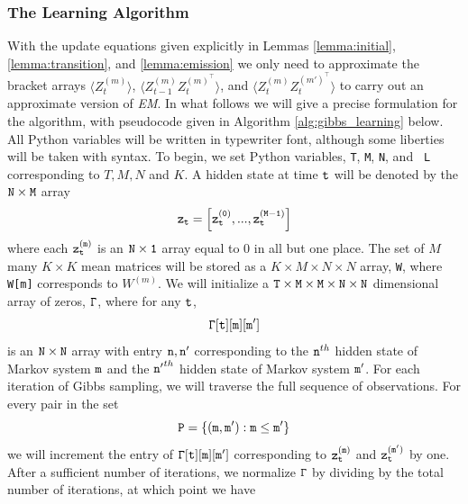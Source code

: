 \documentclass{amsart}
\begin{document}

\subsubsection{The Learning Algorithm}
With the update equations given explicitly in Lemmas 
\ref{lemma:initial}, \ref{lemma:transition}, and \ref{lemma:emission} we 
only need to approximate the bracket arrays 
$\langle Z_{t}^{(m)}\rangle$,
$\langle Z_{t-1}^{(m)}Z_{t}^{(m)^\intercal}\rangle$, and $\langle 
Z_{t}^{(m)}Z_{t}^{(m')^\intercal}\rangle$ to carry out an approximate 
version of {\em EM}. In what follows we will give a precise formulation 
for the algorithm, with pseudocode given in Algorithm 
\ref{alg:gibbs_learning} below.  All Python variables will be written 
in typewriter font, although some liberties will be taken with syntax. 
To begin, we set Python variables, {\tt T}, {\tt M}, {\tt N}, and {\tt 
L} corresponding to $T, M, N$ and $K$.  A hidden state at time ${\tt t}$ will be 
denoted by the ${\tt N\times M}$ array
\[
{\tt z_t} = \left[{\tt z_t^{(0)},...,z_t^{(M-1)}}\right]
\]
where each ${\tt z_t^{(m)}}$ is an ${\tt N\times 1}$ array equal to 0 
in all but one place.  The set of $M$ many $K\times K$ mean matrices 
will be stored as a $K\times M \times N\times N$ array, {\tt W}, where 
{\tt W[m]} corresponds to $W^{(m)}$.  We will initialize a ${\tt T\times M\times 
M\times N\times N}$ 
dimensional array of zeros, ${\tt \Gamma}$, where for any ${\tt t}$, 
\[
{\tt \Gamma[t][m][m']}
\]
is an ${\tt N\times N}$ array with entry ${\tt n,n'}$
corresponding to the 
${\tt n}^{th}$ hidden state of Markov system ${\tt m}$ and the ${\tt 
n'}^{th}$ hidden state of Markov system ${\tt m'}$. For each iteration 
of Gibbs sampling, we will traverse the full sequence of observations. 
For every pair in the set 
\[
{\tt P} = \{{\tt (m,m'):m\leq m'}\}
\] 
we will increment the entry of ${\tt \Gamma[t][m][m']}$ corresponding to ${\tt 
z_t^{(m)}}$ and ${\tt z_t^{(m')}}$ by one.  After a sufficient number 
of iterations, we normalize ${\tt \Gamma}$ by dividing by the total 
number of iterations, at which point we have 
\end{document}
